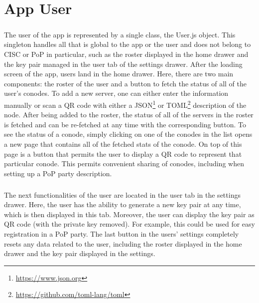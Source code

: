 \chapter{App User}
\paragraph{}
The user of the app is represented by a single class, the User.js object. This singleton handles all that is global to the app or the user and does not belong to CISC or PoP in particular, such as the roster displayed in the home drawer and the key pair managed in the user tab of the settings drawer. After the loading screen of the app, users land in the home drawer. Here, there are two main components: the roster of the user and a button to fetch the status of all of the user’s conodes. To add a new server, one can either enter the information manually or scan a QR code with either a JSON\footnote{\url{https://www.json.org}} or TOML\footnote{\url{https://github.com/toml-lang/toml}} description of the node. After being added to the roster, the status of all of the servers in the roster is fetched and can be re-fetched at any time with the corresponding button. To see the status of a conode, simply clicking on one of the conodes in the list opens a new page that contains all of the fetched stats of the conode. On top of this page is a button that permits the user to display a QR code to represent that particular conode. This permits convenient sharing of conodes, including when setting up a PoP party description.

\paragraph{}
The next functionalities of the user are located in the user tab in the settings drawer. Here, the user has the ability to generate a new key pair at any time, which is then displayed in this tab. Moreover, the user can display the key pair as QR code (with the private key removed). For example, this could be used for easy registration in a PoP party. The last button in the users’ settings completely resets any data related to the user, including the roster displayed in the home drawer and the key pair displayed in the settings.
